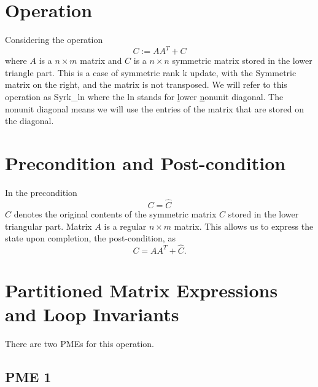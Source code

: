 \section{Operation}

Considering the operation
\[
C := AA^T + C
\]
where $ A $ is a $ n \times m $ matrix and $ C $ is a $ n \times n $ symmetric matrix stored in the lower triangle part.
This is a case of symmetric rank k update, 
with the {\sc S}ymmetric matrix on the {\sc r}ight, 
and the matrix is {\sc n}ot transposed.
We will refer to this operation
as {\sc Syrk\_ln} where the {\sc ln} stands for
\underline{l}ower
\underline{n}onunit diagonal.
The {\sc n}onunit diagonal means we will use the entries of the matrix that are stored on the diagonal.

\section{Precondition and Post-condition}

In the precondition 
\[
C = \widehat C
\]
$ \widehat C $ denotes the original contents of the symmetric matrix $ C $ stored in the lower triangular part. Matrix $ A $ is a regular $ n \times m $ matrix.
This allows us to express the state upon completion, the post-condition, as
\[
C = AA^T + \widehat C .
\]

\section{Partitioned Matrix Expressions and Loop Invariants}

There are two PMEs for this operation.

\subsection{PME 1}

